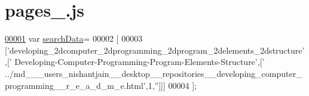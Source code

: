 \hypertarget{pages__0_8js_source}{\section{pages\+\_.\+js}
\label{pages__0_8js_source}
}

\begin{DoxyCode}
\hypertarget{pages__0_8js_source_l00001}{}\hyperlink{pages__0_8js_ad01a7523f103d6242ef9b0451861231e}{00001} var \hyperlink{pages__0_8js_ad01a7523f103d6242ef9b0451861231e}{searchData}=
00002 [
00003   [\textcolor{stringliteral}{'developing\_2dcomputer\_2dprogramming\_2dprogram\_2delements\_2dstructure'},[\textcolor{stringliteral}{'
      Developing-Computer-Programming-Program-Elements-Structure'},[\textcolor{stringliteral}{'
      ../md\_\_\_users\_nishantjain\_\_desktop\_\_repositories\_\_developing\_computer\_programming\_\_r\_e\_a\_d\_m\_e.html'},1,\textcolor{stringliteral}{''}]]]
00004 ];
\end{DoxyCode}
